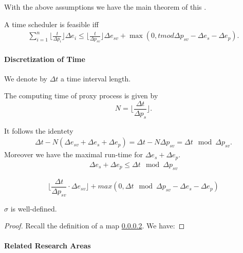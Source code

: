 	With the above assumptions we have the main theorem of this \cite{K}.
	\begin{theorem}
	A time scheduler is feasible iff 
		\begin{align}
		\sum_{i=1}^n \lfloor \frac{t}{\Delta p_i} \rfloor \Delta e_i \leq \lfloor  \frac{t}{\Delta p_{sv}} \rfloor \Delta e_{sv} + \max (0,t  mod \Delta p_{sv} -\Delta e_{s} -\Delta e_p).
		\end{align}
	\end{theorem}
	
	\paragraph{Discretization of Time}
	We denote by $\Delta t$ a time interval length.  
	\begin{definition}
	The computing time of proxy process is given by 
	\begin{equation}
	N = \lfloor \frac{\Delta t}{\Delta p_s} \rfloor.
	\end{equation}
	\end{definition} 
	
	
	It follows the identety
	\begin{align}
	\Delta t - N ( \Delta e_{sv} + \Delta e_{s} + \Delta e_{p} ) = \Delta t - N \Delta p_{sv} = \Delta t \mod \Delta p_{sv}.
	\end{align}
	Moreover we have the maximal run-time for $\Delta e_s + \Delta e_p$.
	\begin{align}
	\Delta e_s + \Delta e_p \leq \Delta t \mod \Delta p_{sv}
	\end{align} 
	
	\begin{equation}
	\lfloor \frac{\Delta t}{ \Delta p_{sv}} \cdot \Delta e_{sv} \rfloor + max ( 0, \Delta t \mod \Delta p_{sv} - \Delta e_{s} - \Delta e_{p})
	\end{equation}
	 
	
	\begin{lemma}
	 $\sigma$ is well-defined.
	\end{lemma}
	\begin{proof}
	Recall the definition of a map \ref{}. We have:
	\end{proof}
	
	\paragraph{Related Research Areas}
	
